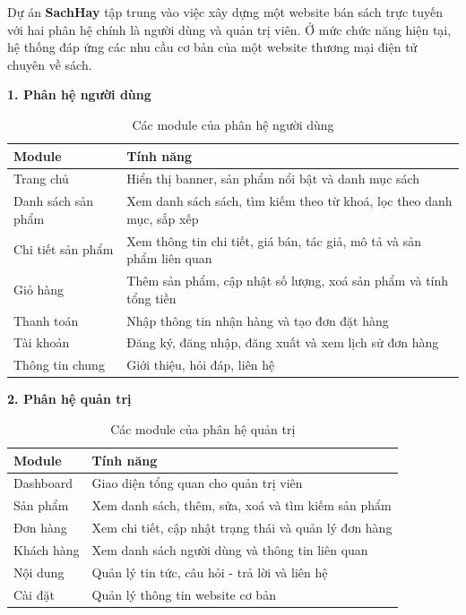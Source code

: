 Dự án \textbf{SachHay} tập trung vào việc xây dựng một website bán sách trực tuyến với hai phân hệ chính là người dùng và quản trị viên. Ở mức chức năng hiện tại, hệ thống đáp ứng các nhu cầu cơ bản của một website thương mại điện tử chuyên về sách.

\textbf{1. Phân hệ người dùng}
\begin{table}[H]
\centering
\begin{tabular}{|l|p{8cm}|}
\hline
\textbf{Module} & \textbf{Tính năng} \\
\hline
Trang chủ & Hiển thị banner, sản phẩm nổi bật và danh mục sách \\
\hline
Danh sách sản phẩm & Xem danh sách sách, tìm kiếm theo từ khoá, lọc theo danh mục, sắp xếp \\
\hline
Chi tiết sản phẩm & Xem thông tin chi tiết, giá bán, tác giả, mô tả và sản phẩm liên quan \\
\hline
Giỏ hàng & Thêm sản phẩm, cập nhật số lượng, xoá sản phẩm và tính tổng tiền \\
\hline
Thanh toán & Nhập thông tin nhận hàng và tạo đơn đặt hàng \\
\hline
Tài khoản & Đăng ký, đăng nhập, đăng xuất và xem lịch sử đơn hàng \\
\hline
Thông tin chung & Giới thiệu, hỏi đáp, liên hệ \\
\hline
\end{tabular}
\caption{Các module của phân hệ người dùng}
\label{tab:user-modules}
\end{table}

\textbf{2. Phân hệ quản trị}
\begin{table}[H]
\centering
\begin{tabular}{|l|p{8cm}|}
\hline
\textbf{Module} & \textbf{Tính năng} \\
\hline
Dashboard & Giao diện tổng quan cho quản trị viên \\
\hline
Sản phẩm & Xem danh sách, thêm, sửa, xoá và tìm kiếm sản phẩm \\
\hline
Đơn hàng & Xem chi tiết, cập nhật trạng thái và quản lý đơn hàng \\
\hline
Khách hàng & Xem danh sách người dùng và thông tin liên quan \\
\hline
Nội dung & Quản lý tin tức, câu hỏi - trả lời và liên hệ \\
\hline
Cài đặt & Quản lý thông tin website cơ bản \\
\hline
\end{tabular}
\caption{Các module của phân hệ quản trị}
\label{tab:admin-modules}
\end{table}

